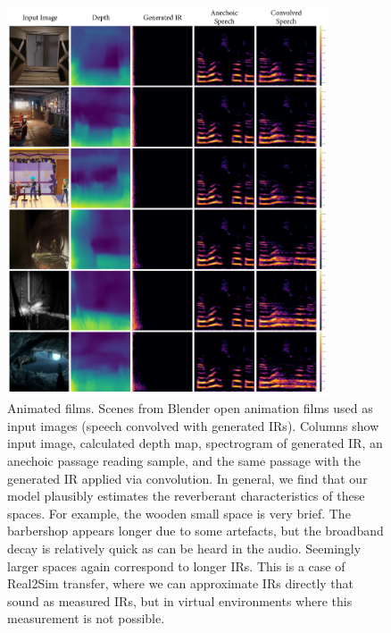 \begin{figure}
    \centering
    \includegraphics[width=0.85\textwidth]{p_animation.png}
    \caption{Animated films. Scenes from Blender open animation films used as input images (speech convolved with generated IRs). Columns show input image, calculated depth map, spectrogram of generated IR, an anechoic passage reading sample, and the same passage with the generated IR applied via convolution. In general, we find that our model plausibly estimates the reverberant characteristics of these spaces. For example, the wooden small space is very brief. The barbershop appears longer due to some artefacts, but the broadband decay is relatively quick as can be heard in the audio. Seemingly larger spaces again correspond to longer IRs. This is a case of Real2Sim transfer, where we can approximate IRs directly that sound as measured IRs, but in virtual environments where this measurement is not possible.}
    \label{fig:p_animation}
\end{figure}

